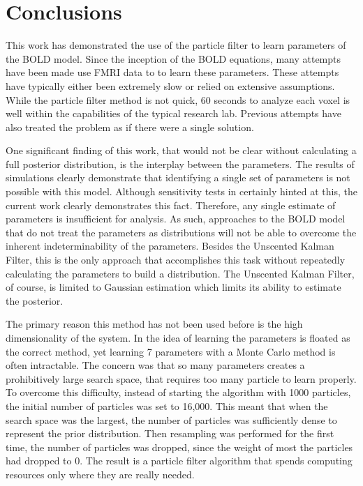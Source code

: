 \chapter{Conclusions}
\label{sec:Conclusion}
This work has demonstrated the use of the particle filter to
learn parameters of the BOLD model. Since the inception of the
BOLD equations, many attempts have been made use FMRI data to 
to learn these parameters. These attempts have typically either been extremely 
slow or relied on extensive assumptions. While the particle filter method
is not quick, 60 seconds to analyze each voxel is well within the capabilities
of the typical research lab. Previous attempts have also treated
the problem as if there were a single solution.

One significant finding of this work, that would not be clear without 
calculating a full posterior distribution, is the interplay 
between the parameters. The results of simulations clearly demonstrate
that identifying a single set of parameters is not possible with this 
model. Although sensitivity tests in \cite{Deneux2006} certainly hinted
at this, the current work clearly demonstrates this fact. Therefore,
any single estimate of parameters is insufficient for analysis. As such,
approaches to the BOLD model that do not treat the parameters as distributions
will not be able to overcome the inherent indeterminability of the
parameters. Besides the Unscented Kalman Filter, this is the only approach
that accomplishes this task without repeatedly calculating the parameters 
to build a distribution. The Unscented Kalman Filter, of course, is limited
to Gaussian estimation which limits its ability to estimate the posterior. 

The primary reason this method has not been used before is the high 
dimensionality of the system. In \cite{Murray2008} the idea of learning
the parameters is floated as the correct method, yet 
learning 7 parameters with a Monte Carlo method is often intractable. The 
concern was that so many parameters creates a prohibitively large 
search space, that requires too many particle to learn properly. To overcome
this difficulty, instead of starting the algorithm with 1000 particles,
the initial number of particles was set to 16,000. This meant that
when the search space was the largest, the number of particles was
sufficiently dense to represent the prior distribution. Then resampling
was performed for the first time, the number of particles was dropped, 
since the weight of most the particles had dropped to 0. The result is
a particle filter algorithm that spends computing resources only where
they are really needed.

